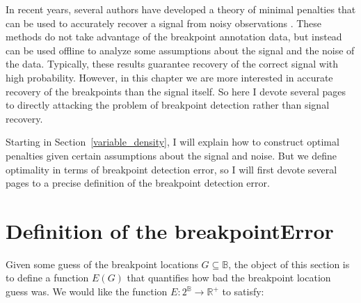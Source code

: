 \documentclass{jsfds} %
\newcommand{\RR}{\mathbb{R}}
\begin{document}
In recent years, several authors have developed a theory of minimal
penalties that can be used to accurately recover a signal from noisy
observations \citep{calibration,lebarbier}. These methods do not take
advantage of the breakpoint annotation data, but instead can be used
offline to analyze some assumptions about the signal and the noise of
the data. Typically, these results guarantee recovery of the correct
signal with high probability. However, in this chapter we are more
interested in accurate recovery of the breakpoints than the signal
itself.
So here I devote several
pages to directly attacking the problem of breakpoint detection rather
than signal recovery.



Starting in Section~\ref{variable_density}, I will explain how to
construct optimal penalties given certain assumptions about the signal
and noise. But we define optimality in terms of breakpoint detection
error, so I will first devote several pages to a precise definition of
the breakpoint detection error.

\section{Definition of the breakpointError}

Given some guess of the breakpoint locations $G\subseteq\mathbb B$,
the object of this section is to define a function ${E }(G)$
that quantifies how bad the breakpoint location guess was. We would
like the function ${E }: 2^{\mathbb B}\rightarrow \RR^+$ to
satisfy:
\end{document}
